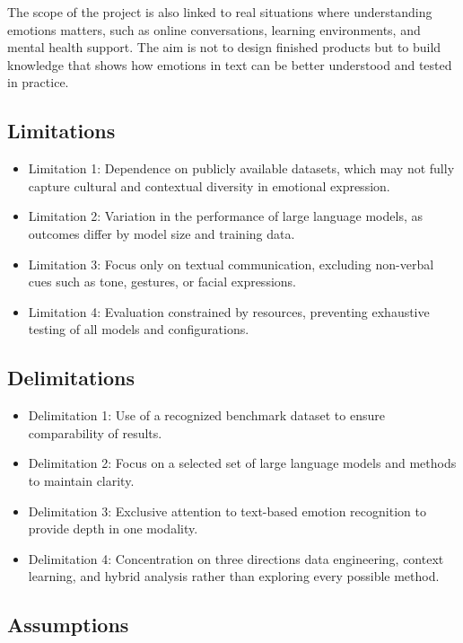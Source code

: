 The scope of the project is also linked to real situations where understanding emotions matters, such as online conversations, learning environments, and mental health support. The aim is not to design finished products but to build knowledge that shows how emotions in text can be better understood and tested in practice.  

\subsection{Limitations}
\begin{itemize}
    \item Limitation 1: Dependence on publicly available datasets, which may not fully capture cultural and contextual diversity in emotional expression.  
    \item Limitation 2: Variation in the performance of large language models, as outcomes differ by model size and training data.  
    \item Limitation 3: Focus only on textual communication, excluding non-verbal cues such as tone, gestures, or facial expressions.  
    \item Limitation 4: Evaluation constrained by resources, preventing exhaustive testing of all models and configurations.  
\end{itemize}

\subsection{Delimitations}
\begin{itemize}
    \item Delimitation 1: Use of a recognized benchmark dataset to ensure comparability of results.  
    \item Delimitation 2: Focus on a selected set of large language models and methods to maintain clarity.  
    \item Delimitation 3: Exclusive attention to text-based emotion recognition to provide depth in one modality.  
    \item Delimitation 4: Concentration on three directions data engineering, context learning, and hybrid analysis rather than exploring every possible method.  
\end{itemize}


\subsection{Assumptions}

